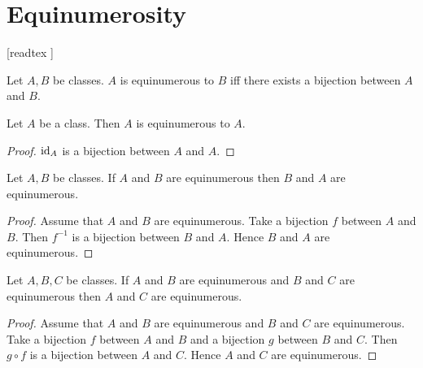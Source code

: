 \documentclass[../set-theory.tex]{subfiles}
\begin{document}
  \chapter{Equinumerosity}\label{equinumerosity}


  \begin{forthel}

    [readtex ]

  \end{forthel}


  \begin{forthel}
    \begin{definition}
      Let $A, B$ be classes.
      $A$ is equinumerous to $B$ iff there exists a bijection between $A$ and
      $B$.
    \end{definition}
  \end{forthel}

  \begin{forthel}
    \begin{proposition}
      Let $A$ be a class.
      Then $A$ is equinumerous to $A$.
    \end{proposition}
    \begin{proof}
      $\operatorname{id}_{A}$ is a bijection between $A$ and $A$.
    \end{proof}
  \end{forthel}

  \begin{forthel}
    \begin{proposition}
      Let $A, B$ be classes.
      If $A$ and $B$ are equinumerous then $B$ and $A$ are equinumerous.
    \end{proposition}
    \begin{proof}
      Assume that $A$ and $B$ are equinumerous.
      Take a bijection $f$ between $A$ and $B$.
      Then $f^{-1}$ is a bijection between $B$ and $A$.
      Hence $B$ and $A$ are equinumerous.
    \end{proof}
  \end{forthel}

  \begin{forthel}
    \begin{proposition}
      Let $A, B, C$ be classes.
      If $A$ and $B$ are equinumerous and $B$ and $C$ are equinumerous then
      $A$ and $C$ are equinumerous.
    \end{proposition}
    \begin{proof}
      Assume that $A$ and $B$ are equinumerous and $B$ and $C$ are
      equinumerous.
      Take a bijection $f$ between $A$ and $B$ and a bijection $g$ between
      $B$ and $C$.
      Then $g \circ f$ is a bijection between $A$ and $C$.
      Hence $A$ and $C$ are equinumerous.
    \end{proof}
  \end{forthel}
\end{document}

